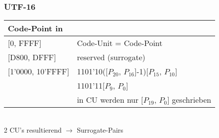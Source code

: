 \subsubsection{UTF-16}
\setlength{\tabcolsep}{0.05em}
\begin{tabular}{ll}
  Code-Point in & \\
   \hline
  $[$0, FFFF$]$ & Code-Unit = Code-Point\\
$[$D800, DFFF$]$ & reserved (surrogate)\\
$[$1'0000, 10'FFFF$]$ &   1101'10($[P_{20}$, $P_{16}]$-1)$[P_{15}$, $P_{10}]$\\
& 1101'11$[P_{9}$, $P_{0}]$\\
& in CU werden nur $[P_{19}$, $P_{0}]$ geschrieben
 \end{tabular}\\
2 CU's resultierend $\rightarrow$ Surrogate-Pairs


